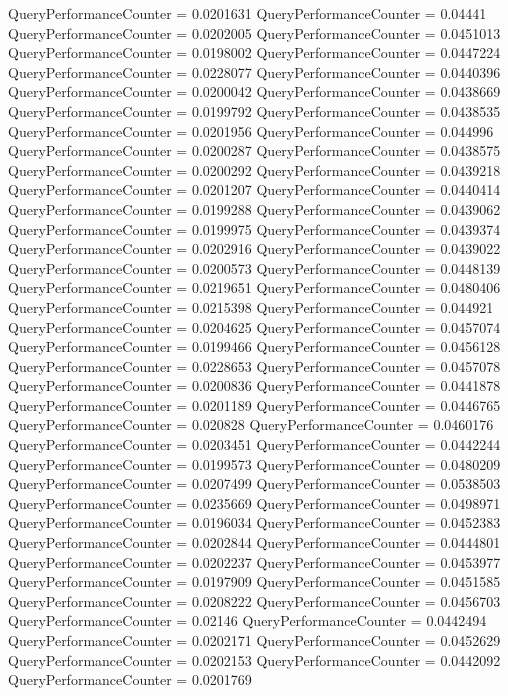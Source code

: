 \documentclass[9pt]{article}
\theoremstyle{plain}
\theoremstyle{definition}
\theoremstyle{remark}
\numberwithin{equation}{section}
\begin{document}
QueryPerformanceCounter  =  0.0201631
QueryPerformanceCounter  =  0.04441
QueryPerformanceCounter  =  0.0202005
QueryPerformanceCounter  =  0.0451013
QueryPerformanceCounter  =  0.0198002
QueryPerformanceCounter  =  0.0447224
QueryPerformanceCounter  =  0.0228077
QueryPerformanceCounter  =  0.0440396
QueryPerformanceCounter  =  0.0200042
QueryPerformanceCounter  =  0.0438669
QueryPerformanceCounter  =  0.0199792
QueryPerformanceCounter  =  0.0438535
QueryPerformanceCounter  =  0.0201956
QueryPerformanceCounter  =  0.044996
QueryPerformanceCounter  =  0.0200287
QueryPerformanceCounter  =  0.0438575
QueryPerformanceCounter  =  0.0200292
QueryPerformanceCounter  =  0.0439218
QueryPerformanceCounter  =  0.0201207
QueryPerformanceCounter  =  0.0440414
QueryPerformanceCounter  =  0.0199288
QueryPerformanceCounter  =  0.0439062
QueryPerformanceCounter  =  0.0199975
QueryPerformanceCounter  =  0.0439374
QueryPerformanceCounter  =  0.0202916
QueryPerformanceCounter  =  0.0439022
QueryPerformanceCounter  =  0.0200573
QueryPerformanceCounter  =  0.0448139
QueryPerformanceCounter  =  0.0219651
QueryPerformanceCounter  =  0.0480406
QueryPerformanceCounter  =  0.0215398
QueryPerformanceCounter  =  0.044921
QueryPerformanceCounter  =  0.0204625
QueryPerformanceCounter  =  0.0457074
QueryPerformanceCounter  =  0.0199466
QueryPerformanceCounter  =  0.0456128
QueryPerformanceCounter  =  0.0228653
QueryPerformanceCounter  =  0.0457078
QueryPerformanceCounter  =  0.0200836
QueryPerformanceCounter  =  0.0441878
QueryPerformanceCounter  =  0.0201189
QueryPerformanceCounter  =  0.0446765
QueryPerformanceCounter  =  0.020828
QueryPerformanceCounter  =  0.0460176
QueryPerformanceCounter  =  0.0203451
QueryPerformanceCounter  =  0.0442244
QueryPerformanceCounter  =  0.0199573
QueryPerformanceCounter  =  0.0480209
QueryPerformanceCounter  =  0.0207499
QueryPerformanceCounter  =  0.0538503
QueryPerformanceCounter  =  0.0235669
QueryPerformanceCounter  =  0.0498971
QueryPerformanceCounter  =  0.0196034
QueryPerformanceCounter  =  0.0452383
QueryPerformanceCounter  =  0.0202844
QueryPerformanceCounter  =  0.0444801
QueryPerformanceCounter  =  0.0202237
QueryPerformanceCounter  =  0.0453977
QueryPerformanceCounter  =  0.0197909
QueryPerformanceCounter  =  0.0451585
QueryPerformanceCounter  =  0.0208222
QueryPerformanceCounter  =  0.0456703
QueryPerformanceCounter  =  0.02146
QueryPerformanceCounter  =  0.0442494
QueryPerformanceCounter  =  0.0202171
QueryPerformanceCounter  =  0.0452629
QueryPerformanceCounter  =  0.0202153
QueryPerformanceCounter  =  0.0442092
QueryPerformanceCounter  =  0.0201769
\end{document}
